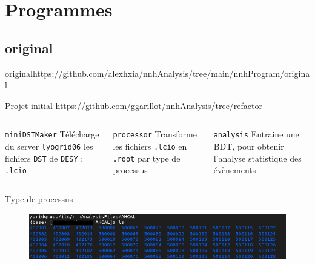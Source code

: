 \documentclass[9pt]{beamer}
\begin{document}
\section{Programmes}

\subsection{original}

\begin{frame}{original}{https://github.com/alexhxia/nnhAnalysis/tree/main/nnhProgram/original}

\begin{block}{Projet initial}
	\url{https://github.com/ggarillot/nnhAnalysis/tree/refactor}
\end{block}

\begin{columns}

	\begin{column}{0.33\textwidth}
		\begin{block}{\texttt{miniDSTMaker}}
			Télécharge du server \texttt{lyogrid06} les fichiers \texttt{DST} de \texttt{DESY} : \texttt{.lcio}
		\end{block}
	\end{column}
	
	\begin{column}{0.33\textwidth}
		\begin{block}{\texttt{processor}}
			Transforme les fichiers \texttt{.lcio} en \texttt{.root} par type de processus
		\end{block}
	\end{column}
	
	\begin{column}{0.33\textwidth}
		\begin{block}{\texttt{analysis}}
			Entraine une BDT, pour obtenir l'analyse statistique des évènements
		\end{block}
	\end{column}

\end{columns}

\begin{block}{Type de processus}
	\begin{figure}
		\center
		\includegraphics[width=\textwidth]{../img/listeProcessus.png} 
	\end{figure}
\end{block}

\end{frame}
\end{document}
